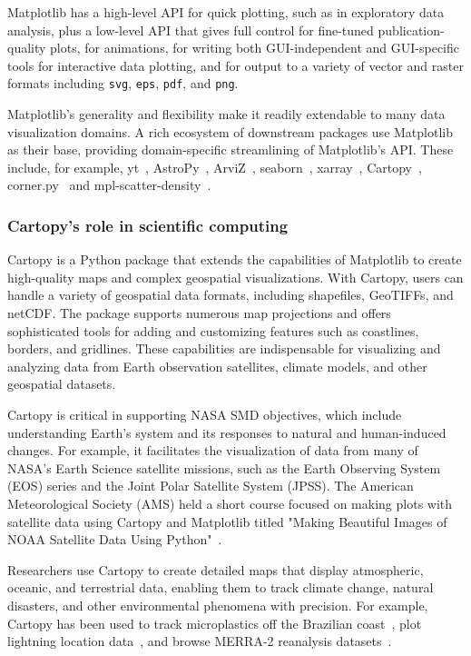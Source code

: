 \documentclass[12pt]{article}
\numberwithin{page}{section}
\begin{document}
Matplotlib has a high-level API for quick plotting, such as in exploratory data
analysis, plus a low-level API that gives full control for fine-tuned
publication-quality plots, for animations, for writing both GUI-independent and
GUI-specific tools for interactive data plotting, and for output to a variety
of vector and raster formats including \texttt{svg}, \texttt{eps},
\texttt{pdf}, and \texttt{png}.

Matplotlib's generality and flexibility make it readily extendable to
many data visualization domains.  A rich ecosystem of downstream packages use
Matplotlib as their base, providing domain-specific streamlining of
Matplotlib's API.  These include, for example,
yt~\cite{2011ApJS..192....9T}, AstroPy~\cite{astropy:2013,
  astropy:2018}, ArviZ~\cite{arviz_2019},
seaborn~\cite{waskom2020seaborn}, xarray~\cite{hoyer2017xarray},
Cartopy~\cite{Cartopy}, corner.py~\cite{corner} and
mpl-scatter-density~\cite{mpl-scatter-density}.


\subsubsection{Cartopy's role in scientific computing}

Cartopy is a Python package that extends the capabilities of Matplotlib
to create high-quality maps and complex geospatial visualizations.
With Cartopy, users can handle a variety of geospatial data formats,
including shapefiles, GeoTIFFs, and netCDF.
The package supports numerous map projections and offers sophisticated tools for
adding and customizing features such as coastlines, borders, and gridlines.
These capabilities are indispensable for visualizing and analyzing data from
Earth observation satellites, climate models, and other geospatial datasets.

Cartopy is critical in supporting NASA SMD objectives,
which include understanding Earth's system and its responses to natural and human-induced changes.
For example, it facilitates the visualization of data from many of NASA's Earth Science satellite missions,
such as the Earth Observing System (EOS) series and the Joint Polar Satellite System (JPSS).
The American Meteorological Society (AMS) held a short course focused on making
plots with satellite data using Cartopy and Matplotlib titled
"Making Beautiful Images of NOAA Satellite Data Using Python"~\cite{noaa_short_course}.

Researchers use Cartopy to create detailed maps that display atmospheric, oceanic,
and terrestrial data, enabling them to track climate change, natural disasters,
and other environmental phenomena with precision. For example, Cartopy
has been used to track microplastics off the Brazilian coast~\cite{tracking_microplastics},
plot lightning location data~\cite{lightning_location}, and browse MERRA-2
reanalysis datasets~\cite{merra2_plotting}.
\end{document}
